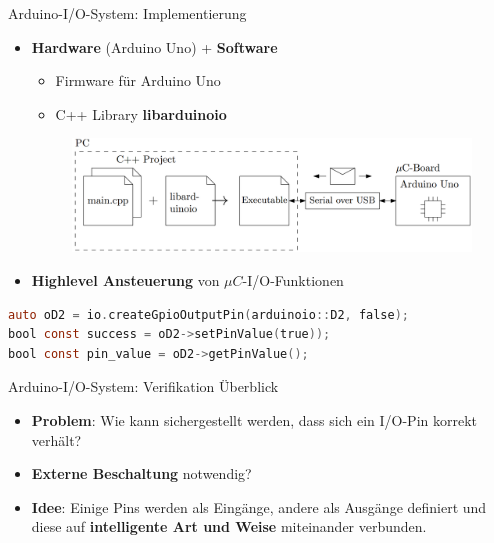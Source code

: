 \documentclass{beamer}
\begin{document}
\begin{frame}[fragile]{Arduino-I/O-System: Implementierung}
	\begin{itemize}
		\item \textbf{Hardware} (Arduino Uno) + \textbf{Software}
		\begin{itemize}
			\item Firmware f\"ur Arduino Uno
			\item C++ Library \textbf{libarduinoio}
		\end{itemize}
		\begin{figure}[htbp]
			\centering
			\includegraphics[scale=0.2]{./images/arduinoio-system-overview.png}
		\end{figure}
		\item \textbf{Highlevel Ansteuerung} von $\mu{}C$-I/O-Funktionen
	\end{itemize}
\begin{lstlisting}[frame=single, language=C]
auto oD2 = io.createGpioOutputPin(arduinoio::D2, false);
bool const success = oD2->setPinValue(true));
bool const pin_value = oD2->getPinValue();
\end{lstlisting}
\end{frame}
\begin{frame}{Arduino-I/O-System: Verifikation \"Uberblick}
\begin{itemize}
 \item \textbf{Problem}: Wie kann sichergestellt werden, dass sich ein I/O-Pin korrekt
  verh\"alt? 
    \end{itemize} 
   \begin{itemize}
   \item \textbf{Externe Beschaltung} notwendig?
\end{itemize}
\vspace{10px}
	\begin{itemize}
		\item \textbf{Idee}: Einige Pins werden als Eing\"ange, andere als Ausg\"ange definiert und diese auf \textbf{intelligente Art und Weise} miteinander verbunden.
	\end{itemize}
\end{frame}
\end{document}
